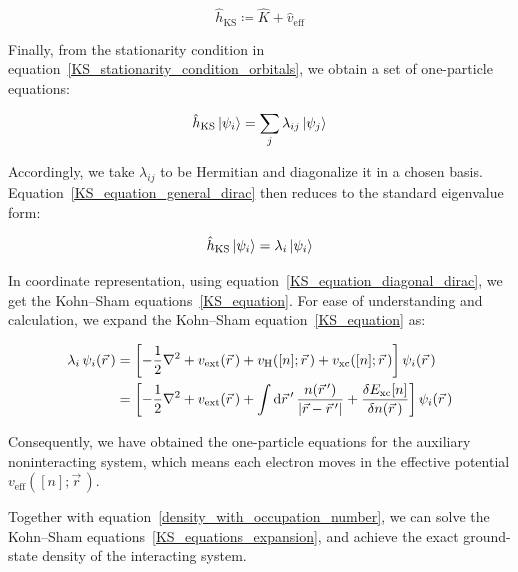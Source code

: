 \begin{equation}
    \hat{h}_\mathrm{KS}\coloneqq
    \hat{K}+\hat{v}_\mathrm{eff}
\label{KS_one_body_hamiltonian_definition}
\end{equation}

Finally, from the stationarity condition in equation~\eqref{KS_stationarity_condition_orbitals},
we obtain a set of one-particle equations:

\begin{equation}
    \hat{h}_\mathrm{KS}\ket{\psi_i} =
    \sum_j\lambda_{ij}\ket{\psi_j}
\label{KS_equation_general_dirac}
\end{equation}

Accordingly, we take $\lambda_{ij}$ to be Hermitian and diagonalize it in a chosen basis.
Equation~\eqref{KS_equation_general_dirac} then reduces to the standard eigenvalue form:

\begin{equation}
    \hat{h}_\mathrm{KS}\ket{\psi_i} =
    \lambda_i\ket{\psi_i}
\label{KS_equation_diagonal_dirac}
\end{equation}

In coordinate representation, using equation~\eqref{KS_equation_diagonal_dirac}, we get the Kohn--Sham equations~\eqref{KS_equation}.
For ease of understanding and calculation, we expand the Kohn--Sham equation~\eqref{KS_equation} as:

\begin{equation}
\begin{aligned}
    \lambda_i\,\psi_i(\vec{r}\,)
    &=\left[
    -\frac{1}{2}\nabla^2
    +v_\mathrm{ext}(\vec{r}\,)
    +v_\mathrm{H}([n];\vec{r}\,)
    +v_\mathrm{xc}([n];\vec{r}\,)
    \right]\psi_i(\vec{r}\,) \\
    &=\left[
    -\frac{1}{2}\nabla^2
    +v_\mathrm{ext}(\vec{r}\,)
    +\int\mathrm{d}{\vec{r}\,'}\,\frac{n(\vec{r}\,')}{|\vec{r}-\vec{r}\,'|}
    +\frac{\delta E_\mathrm{xc}[n]}{\delta n(\vec{r}\,)}
    \right]\psi_i(\vec{r}\,)
\end{aligned}
\label{KS_equations_expansion}
\end{equation}

Consequently, we have obtained the one-particle equations for the auxiliary noninteracting system,
which means each electron moves in the effective potential $v_\mathrm{eff}([n];\vec{r}\,)$.

Together with equation~\eqref{density_with_occupation_number},
we can solve the Kohn--Sham equations~\eqref{KS_equations_expansion},
and achieve the exact ground-state density of the interacting system.

